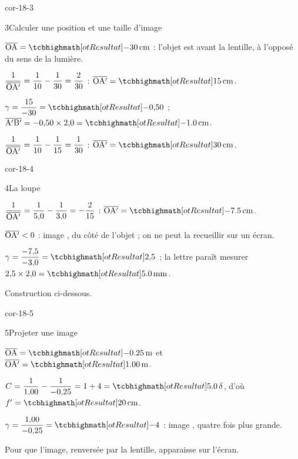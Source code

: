 \begin{blocLivre}{cor-18-3}
\begin{corrige}{3}{Calculer une position et une taille d'image}
\begin{questions}
\item $\alg{OA}=\res{\qty{-30}{cm}}$ : l'objet est avant la lentille, à l'opposé du sens de la lumière.
\item $\dfrac{1}{\overline{\mathrm{OA'}}}=\dfrac{1}{10}-\dfrac{1}{30}=\dfrac{2}{30}$ : $\alg{OA'}=\res{\qty{15}{cm}}$.
\item $\gamma=\dfrac{15}{-30}=\res{-0{,}50}$ ; $\alg{A'B'}=-0{,}50\times2{,}0=\res{\qty{-1,0}{cm}}$.
\item $\dfrac{1}{\overline{\mathrm{OA'}}}=\dfrac{1}{10}-\dfrac{1}{15}=\dfrac{1}{30}$ : $\alg{OA'}=\res{\qty{30}{cm}}$.
\end{questions}
\end{corrige}
\end{blocLivre}
\begin{blocLivre}{cor-18-4}
\begin{corrige}{4}{La loupe}
\begin{questions}
\item $\dfrac{1}{\overline{\mathrm{OA'}}}=\dfrac{1}{5{,}0}-\dfrac{1}{3{,}0}=-\dfrac{2}{15}$ : $\alg{OA'}=\res{\qty{-7,5}{cm}}$.
\item $\overline{\mathrm{OA'}}<0$ : image , du côté de l'objet ; on ne peut  la recueillir sur un écran.
\item $\gamma=\dfrac{-7{,}5}{-3{,}0}=\res{2{,}5}$ ; la lettre paraît mesurer $2{,}5\times2{,}0=\res{\qty{5,0}{mm}}$.
\item Construction ci-dessous.
\end{questions}
\end{corrige}
\end{blocLivre}
\begin{blocLivre}{cor-18-5}
\begin{corrige}{5}{Projeter une image}
\begin{questions}
\item $\alg{OA}=\res{\qty{-0,25}{m}}$ et $\alg{OA'}=\res{\qty{1,00}{m}}$.
\item $C=\dfrac{1}{1{,}00}-\dfrac{1}{-0{,}25}=1+4=\res{\num{5,0}\,\delta}$, d'où $f'=\res{\qty{20}{cm}}$.
\item $\gamma=\dfrac{1{,}00}{-0{,}25}=\res{-4}$ : image , quatre fois plus grande.
\item Pour que l'image, renversée par la lentille, apparaisse  sur l'écran.
\end{questions}
\end{corrige}
\end{blocLivre}
